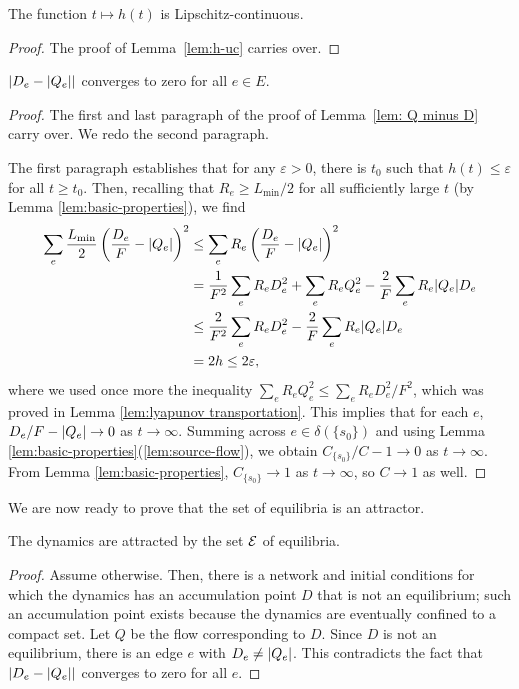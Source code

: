 \documentclass[11pt,a4paper]{article}
\newcommand{\Lmin}{\ensuremath{L_{\mathrm{min}}}}
\newcommand{\E}{\cal E}
\begin{document}

\begin{lemma}
\label{lem:h-uc transportation}
The function $t \mapsto h(t)$ is Lipschitz-continuous.
\end{lemma}
\begin{proof} The proof of Lemma~\ref{lem:h-uc} carries over. \end{proof}


\begin{lemma}\label{lem: Q minus D transportation} $| D_e - | Q_e | |$ converges to zero
for all $e \in E$. \end{lemma}
\begin{proof} The first and last paragraph of the proof of Lemma~\ref{lem: Q
minus D} carry over. We redo the second paragraph. 

The first paragraph establishes that for any $\varepsilon>0$, there is $t_0$ such
that $h(t) \le \varepsilon$ for all $t \ge t_0$.  Then, recalling that $R_e \ge
\Lmin/2$ for all sufficiently large $t$ (by Lemma \ref{lem:basic-properties}),
we find  
\begin{align*}
\sum_e \frac{\Lmin}{2} \left( \frac{D_e}{F} - \abs{Q_e} \right)^2 
&\le 
\sum_e R_e \left( \frac{D_e}{F} - \abs{Q_e} \right)^2 \\
&= \frac{1}{F^2} \sum_e R_e D_e^2 + \sum_e R_e Q_e^2 - \frac{2}{F} \sum_e R_e \abs{Q_e} D_e  \\
&\le \frac{2}{F^2} \sum_e R_e D_e^2 - \frac{2}{F} \sum_e R_e \abs{Q_e} D_e \\
&= 2 h \le 2 \varepsilon, 
\end{align*}
where we used once more the inequality $\sum_e R_e Q_e^2 \le \sum_e R_e
D_e^2/F^2$, which was proved in Lemma \ref{lem:lyapunov transportation}.  
This implies that for each $e$, $D_e/F - | Q_e | \to 0$ as $t \to
\infty$. Summing across $e \in \delta(\{s_0\})$ and using Lemma
\ref{lem:basic-properties}(\ref{lem:source-flow}), we obtain $C_{\{s_0\}}/C - 1
\to 0$ as $t \to \infty$.  From Lemma \ref{lem:basic-properties}, $C_{\{s_0\}}
\to 1$ as $t \to \infty$, so $C \to 1$ as well. 
\end{proof}

We are now ready to prove that the set of equilibria is an attractor.

\begin{theorem}\label{thm: equilibria attract} 
The dynamics are attracted by the set $\E$ of equilibria. 
\end{theorem}
\begin{proof} Assume otherwise. Then, there is a network and initial conditions
for which the dynamics has an accumulation point $D$ that is not an
equilibrium; such an accumulation point exists because the dynamics are eventually confined to a compact set. 
Let $Q$ be the flow corresponding to $D$. Since $D$ is not
an equilibrium, there is an edge $e$ with $D_e \not= | Q_e |$. This
contradicts the fact that $| D_e - | Q_e | |$ converges to zero for all
$e$.
\end{proof}
\end{document}
